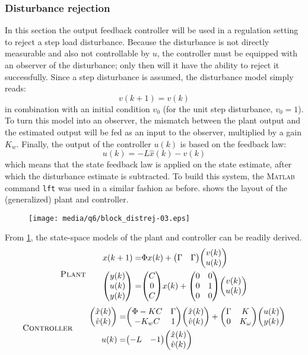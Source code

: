 \subsubsection{Disturbance rejection}
In this section the output feedback controller will be used in a regulation setting to reject a step load disturbance. Because the disturbance is not directly measurable and also not controllable by $u$, the controller must be equipped with an observer of the disturbance; only then will it have the ability to reject it successfully. Since a step disturbance is assumed, the disturbance model simply reads:
                                $$v(k + 1) = v(k)$$
in combination with an initial condition $v_0$ (for the unit step disturbance, $v_0 = 1$). To turn this model into an observer, the mismatch between the plant output and the estimated output will be fed as an input to the observer, multiplied by a gain $K_w$. Finally, the output of the controller $u(k)$ is based on the feedback law:
                                $$u(k) = -L\hat{x}(k) - \hat{v}(k)$$
which means that the state feedback law is applied on the state estimate, after which the disturbance estimate is subtracted. To build this system, the \textsc{Matlab} command \texttt{lft} was used in a similar fashion as before.  shows the layout of the (generalized) plant and controller.
\begin{figure}[ht!]
    \centering
    \texttt{[image: media/q6/block\_distrej-03.eps]}
    \caption{}
    \label{fig:q6_block_distrej}
\end{figure}
From \cref{fig:q6_block_distrej}, the state-space models of the plant and controller can be readily derived.
\begin{equation}
    \text{\textsc{Plant}}\qquad
    \begin{aligned}
        x(k+1) =& \Phi x(k) + \mqty(\Gamma&\Gamma)\mqty(v(k)\\u(k))\\
        \mqty(y(k)\\u(k)\\y(k)) =& \mqty(C\\0\\C)x(k) + \mqty(0&0\\0&1\\0&0)\mqty(v(k)\\u(k))\\ 
    \end{aligned}
\end{equation}
\phantom{x}
\begin{equation}
    \text{\textsc{Controller}}\qquad
    \begin{aligned}
        \mqty(\hat{x}(k)\\\hat{v}(k)) =& \mqty(\Phi-KC & \Gamma\\-K_wC&1)\mqty(\hat{x}(k)\\\hat{v}(k)) + \mqty(\Gamma&K\\0&K_\omega)\mqty(u(k)\\y(k))\\
        u(k) =& \mqty(-L&-1)\mqty(\hat{x}(k)\\\hat{v}(k))
    \end{aligned}
\end{equation}
